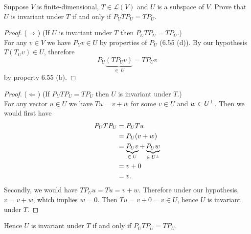 Suppose $V$ is finite-dimensional, $T \in \mathcal{L}(V)$ and $U$ is a subspace of $V$.  Prove that $U$ is invariant under $T$ if and only if $P_UTP_U = TP_U$.

\vspace{0.5in}

\begin{proof} ($\Longrightarrow$) (If $U$ is invariant under $T$ then $P_UTP_U = TP_U$.)
\\ For any $v \in V$ we have $P_U v \in U$ by properties of $P_U$ (6.55 (d)). By our hypothesis $T(T_Uv) \in U$, therefore
$$P_U \underbrace{(TP_Uv)}_{\in \; U} = TP_Uv$$
by property 6.55 (b).
\end{proof}
\vspace{.5in}
\begin{proof} ($\Longleftarrow$) (If $P_UTP_U = TP_U$ then $U$ is invariant under $T$.)
\\For any vector $u \in U$ we have $Tu = v + w$ for some $v \in U$ and $w \in {U}^{\perp}$. Then we would first have
\begin{align*}
    P_UTP_U &= P_UTu\\
    &= P_U(v+w)\\
    &= \underbrace{P_Uv}_{\in \; U} + \underbrace{P_Uw}_{\in \; {U}^{\perp}}\\
    &= v + 0
    \\ &= v.
\end{align*}
Secondly, we would have $TP_Uu = Tu = v + w$. Therefore under our hypothesis, $v = v + w$, which implies $w = 0$. Then $Tu = v + 0 = v \in U$, hence $U$ is invariant under $T$.
\end{proof}

\nnl Hence $U$ is invariant under $T$ if and only if $P_UTP_U = TP_U$.
